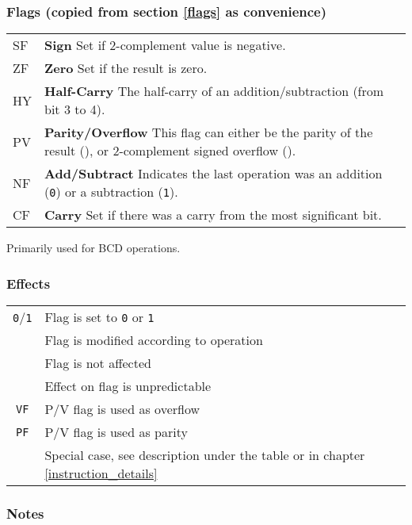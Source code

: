 \subsubsection{Flags \textnormal{(copied from section \ref{flags} as convenience)}}

\begin{tabularx}{\linewidth}{lX}
	SF & 
		\textbf{Sign} Set if 2-complement value is negative.\\
	ZF\notet & 
		\textbf{Zero} Set if the result is zero. \\
	HY\notet & 
		\textbf{Half-Carry} The half-carry of an addition/subtraction (from bit 3 to 4)\See{*}. \\
	PV\notet & 
		\textbf{Parity/Overflow} This flag can either be the parity of the result ({\tt \FPP}), or 2-complement signed overflow ({\tt \FPV}). \\
	NF\notet & 
		\textbf{Add/Subtract} Indicates the last operation was an addition ({\tt 0}) or a subtraction ({\tt 1})\See{*}. \\
	CF\notet & 
		\textbf{Carry} Set if there was a carry from the most significant bit. \\
\end{tabularx}

\See{*} \small{Primarily used for BCD operations.}


\subsubsection{Effects}

\begin{tabular}{cl}
	{\tt 0}/{\tt 1} & Flag is set to {\tt 0} or {\tt 1} \\
	{\tt \FS} & Flag is modified according to operation \\
	{\tt \FN} & Flag is not affected \\
	{\tt \FU} & Effect on flag is unpredictable \\
	{\tt VF} & P/V flag is used as overflow \\
	{\tt PF} & P/V flag is used as parity \\
	{\tt \FX} & Special case, see description under the table or in chapter \ref{instruction_details}
\end{tabular}

\subsubsection{Notes}


